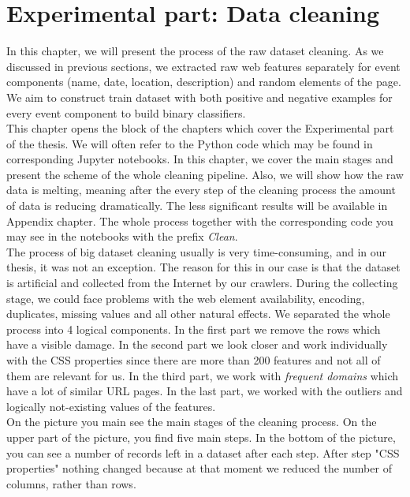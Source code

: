 \chapter{Experimental part: Data cleaning}
\label{chap:clean}
In this chapter, we will present the process of the raw dataset cleaning. As we discussed in previous sections, we extracted raw web features separately for event components (name, date, location, description) and random elements of the page. We aim to construct train dataset with both positive and negative examples for every event component to build binary classifiers. \\

This chapter opens the block of the chapters which cover the Experimental part of the thesis. We will often refer to the Python code which may be found in corresponding Jupyter notebooks. In this chapter, we cover the main stages and present the scheme of the whole cleaning pipeline. Also, we will show how the raw data is melting, meaning after the every step of the cleaning process the amount of data is reducing dramatically. The less significant results will be available in Appendix chapter. The whole process together with the corresponding code you may see in the notebooks with the prefix \textit{Clean}.\\

The process of big dataset cleaning usually is very time-consuming, and in our thesis, it was not an exception. The reason for this in our case is that the dataset is artificial and collected from the Internet by our crawlers. During the collecting stage, we could face problems with the web element availability, encoding, duplicates, missing values and all other natural effects. We separated the whole process into 4 logical components. In the first part we remove the rows which have a visible damage. In the second part we look closer and work individually with the CSS properties since there are more than 200 features and not all of them are relevant for us. In the third part, we work with \textit{frequent domains} which have a lot of similar URL pages. In the last part, we worked with the outliers and logically not-existing values of the features. \\

On the picture  you main see the main stages of the cleaning process. On the upper part of the picture, you find five main steps. In the bottom of the picture, you can see a number of records left in a dataset after each step. After step "CSS properties" nothing changed because at that moment we reduced the number of columns, rather than rows. 

